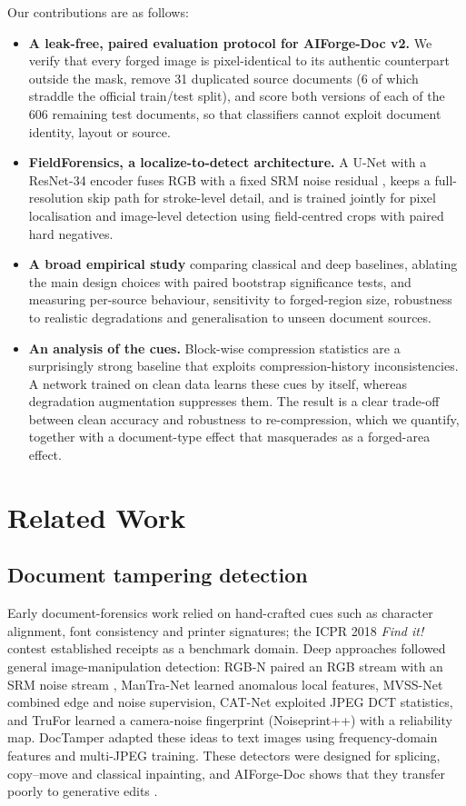 \documentclass[conference]{IEEEtran}
\begin{document}
Our contributions are as follows:

\begin{itemize}
\item \textbf{A leak-free, paired evaluation protocol for AIForge-Doc v2.} We verify that every forged image is pixel-identical to its authentic counterpart outside the mask, remove 31 duplicated source documents (6 of which straddle the official train/test split), and score both versions of each of the 606 remaining test documents, so that classifiers cannot exploit document identity, layout or source.
\item \textbf{FieldForensics, a localize-to-detect architecture.} A U-Net \cite{unet} with a ResNet-34 \cite{resnet} encoder fuses RGB with a fixed SRM noise residual \cite{srm,rgbn}, keeps a full-resolution skip path for stroke-level detail, and is trained jointly for pixel localisation and image-level detection using field-centred crops with paired hard negatives.
\item \textbf{A broad empirical study} comparing classical and deep baselines, ablating the main design choices with paired bootstrap significance tests, and measuring per-source behaviour, sensitivity to forged-region size, robustness to realistic degradations and generalisation to unseen document sources.
\item \textbf{An analysis of the cues.} Block-wise compression statistics are a surprisingly strong baseline that exploits compression-history inconsistencies. A network trained on clean data learns these cues by itself, whereas degradation augmentation suppresses them. The result is a clear trade-off between clean accuracy and robustness to re-compression, which we quantify, together with a document-type effect that masquerades as a forged-area effect.
\end{itemize}
\section{Related Work}\label{sec:rel}
\subsection{Document tampering detection}
Early document-forensics work relied on hand-crafted cues such as character alignment, font consistency and printer signatures; the ICPR 2018 \emph{Find it!} contest \cite{findit} established receipts as a benchmark domain. Deep approaches followed general image-manipulation detection: RGB-N \cite{rgbn} paired an RGB stream with an SRM noise stream \cite{srm}, ManTra-Net \cite{mantra} learned anomalous local features, MVSS-Net \cite{mvss} combined edge and noise supervision, CAT-Net \cite{catnet} exploited JPEG DCT statistics, and TruFor \cite{trufor} learned a camera-noise fingerprint (Noiseprint++) with a reliability map. DocTamper \cite{doctamper} adapted these ideas to text images using frequency-domain features and multi-JPEG training. These detectors were designed for splicing, copy--move and classical inpainting, and AIForge-Doc shows that they transfer poorly to generative edits \cite{aiforge1,aiforge2}.
\end{document}

